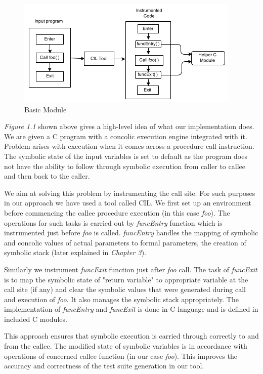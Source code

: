 \documentclass[12pt,oneside]{book}
\begin{document}
\begin{figure}[htbp]
\centering
\includegraphics[scale=1]{module3.png}
\caption{Basic Module}
\end{figure}

\textit{Figure 1.1} shown above gives a high-level idea of what our implementation does. We are given a C program with a concolic execution engine integrated with it. Problem arises with execution when it comes across a procedure call instruction. The symbolic state of the input variables is set to default as the program does not have the ability to follow through symbolic execution from caller to callee and then back to the caller.

We aim at solving this problem by instrumenting the call site. For such purposes in our approach we have used a tool called CIL. We first set up an environment before commencing the callee procedure execution (in this case \textit{foo}). The operations for such tasks is carried out by \textit{funcEntry} function which is instrumented just before \textit{foo} is called. \textit{funcEntry} handles the mapping of symbolic and concolic values of actual parameters to formal parameters, the creation of symbolic stack (later explained in \textit{Chapter 3}).

Similarly we instrument \textit{funcExit} function just after \textit{foo} call. The task of \textit{funcExit} is to map the symbolic state of "return variable" to appropriate variable at the call site (if any) and clear the symbolic values that were generated during call and execution of \textit{foo}. It also manages the symbolic stack appropriately. The implementation of \textit{funcEntry} and \textit{funcExit} is done in C language and is defined in included C modules.

This approach ensures that symbolic execution is carried through correctly to and from the callee. The modified state of symbolic variables is in accordance with operations of concerned callee function (in our case \textit{foo}). This improves the accuracy and correctness of the test suite generation in our tool.  
\end{document}
